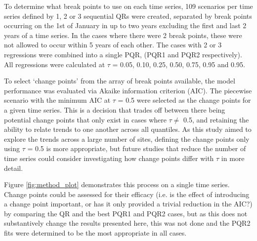 \documentclass[journal abbreviation, manuscript]{copernicus}
\begin{document}
To determine what break points to use on each time series, 109 scenarios per time series defined by 1, 2 or 3 sequential QRs were created, separated by break points occurring on the 1st of January in up to two years excluding the first and last 2 years of a time series. In the cases where there were 2 break points, these were not allowed to occur within 5 years of each other. The cases with 2 or 3 regressions were combined into a single PQR, (PQR1 and PQR2 respectively). All regressions were calculated at $\tau$ = 0.05, 0.10, 0.25, 0.50, 0.75, 0.95 and 0.95.

To select ‘change points’ from the array of break points available, the model performance was evaluated via Akaike information criterion (AIC). The piecewise scenario with the minimum AIC at $\tau$ = 0.5 were selected as the change points for a given time series. This is a decision that  trades off between there being potential change points that only exist in cases where $\tau \neq$ 0.5, and retaining the ability to relate trends to one another across all quantiles. As this study aimed to explore the trends across a large number of sites, defining the change points only using $\tau$ = 0.5 is more appropriate, but future studies that reduce the number of time series could consider investigating how change points differ with $\tau$ in more detail.

Figure \ref{fig:method_plot} demonstrates this process on a single time series. Change points could be assessed for their efficacy (i.e. is the effect of introducing a change point important, or has it only provided a trivial reduction in the AIC?) by comparing the QR and the best PQR1 and PQR2 cases, but as this does not substantively change the results presented here, this was not done and the PQR2 fits were determined to be the most appropriate in all cases.
\end{document}
